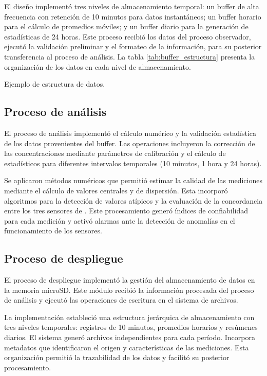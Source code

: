 El diseño implementó tres niveles de almacenamiento temporal: un buffer de alta frecuencia con retención de 10 minutos para datos instantáneos; un buffer horario para el cálculo de promedios móviles; y un buffer diario para la generación de estadísticas de 24 horas. Este proceso recibió los datos del proceso observador, ejecutó la validación preliminar y el formateo de la información, para su posterior transferencia al proceso de análisis. La tabla \ref{tab:buffer_estructura} presenta la organización de los datos en cada nivel de almacenamiento.

\begin{table}[htbp]
	\centering
	\small
	\caption{Ejemplo de estructura de datos.}
	\label{tab:buffer_estructura}
	
\end{table}                           


\subsection{Proceso de análisis}
El proceso de análisis implementó el cálculo numérico y la validación estadística de los datos provenientes del buffer. Las operaciones incluyeron la corrección de las concentraciones mediante parámetros de calibración y el cálculo de estadísticos para diferentes intervalos temporales (10 minutos, 1 hora y 24 horas).

Se aplicaron métodos numéricos que permitió estimar la calidad de las mediciones mediante el cálculo de valores centrales y de dispersión. Esta incorporó algoritmos para la detección de valores atípicos y la evaluación de la concordancia entre los tres sensores de \MPF. Este procesamiento generó índices de confiabilidad para cada medición y activó alarmas ante la detección de anomalías en el funcionamiento de los sensores.

\subsection{Proceso de despliegue}
El proceso de despliegue implementó la gestión del almacenamiento de datos en la memoria microSD. Este módulo recibió la información procesada del proceso de análisis y ejecutó las operaciones de escritura en el sistema de archivos.

La implementación estableció una estructura jerárquica de almacenamiento con tres niveles temporales: registros de 10 minutos, promedios horarios y resúmenes diarios. El sistema generó archivos independientes para cada período. Incorpora metadatos que identificaron el origen y características de las mediciones. Esta organización permitió la trazabilidad de los datos y facilitó su posterior procesamiento.

